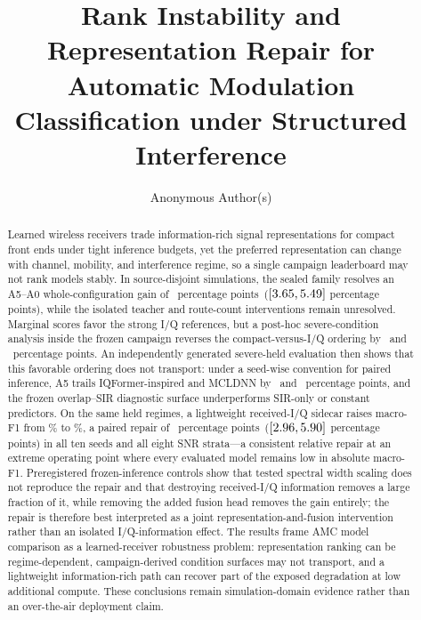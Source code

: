 \documentclass[letterpaper,journal]{IEEEtran}
\title{Rank Instability and Representation Repair for Automatic Modulation
Classification under Structured Interference}
\author{Anonymous Author(s)}
\newcommand{\pp}{percentage points}
\begin{document}
\maketitle

\begin{abstract}
Learned wireless receivers trade information-rich signal representations for
compact front ends under tight inference budgets, yet the preferred
representation can change with channel, mobility, and interference regime, so
a single campaign leaderboard may not rank models stably. In source-disjoint
simulations, the sealed family resolves an A5--A0 whole-configuration gain of
\MethodEffectDiff\ \pp\
($[3.65,5.49]$ \pp), while the isolated teacher
and route-count interventions remain unresolved. Marginal scores favor the
strong I/Q references, but a post-hoc severe-condition analysis inside the
frozen campaign reverses the compact-versus-I/Q ordering by
\SevereGainMcldnn\ and \SevereGainIqformer\ \pp. An independently generated
severe-held evaluation then shows that this favorable ordering does not
transport: under a seed-wise convention for paired inference, A5 trails
IQFormer-inspired and MCLDNN by \SevereSeedMeanGapIqformer\ and
\SevereSeedMeanGapMcldnn\ \pp, and the frozen overlap--SIR diagnostic surface
underperforms SIR-only or constant predictors. On the same held regimes, a
lightweight received-I/Q sidecar raises macro-F1 from \SevereRepairLevelAFive\%
to \SevereRepairLevelSidecar\%, a paired repair of \SevereRepairDiff\ \pp\
($[2.96,5.90]$ \pp) in all ten seeds and all
eight SNR strata---a consistent relative repair at an extreme operating point
where every evaluated model remains low in absolute macro-F1. Preregistered
frozen-inference controls show that tested spectral width scaling does not
reproduce the repair and that destroying received-I/Q information removes a
large fraction of it, while removing the added fusion head removes the gain
entirely; the repair is therefore best interpreted as a joint
representation-and-fusion intervention rather than an isolated
I/Q-information effect. The results frame AMC model comparison as a
learned-receiver robustness problem: representation ranking can be
regime-dependent, campaign-derived condition surfaces may not transport, and a
lightweight information-rich path can recover part of the exposed degradation
at low additional compute. These conclusions remain simulation-domain evidence
rather than an over-the-air deployment claim.
\end{abstract}
\end{document}
